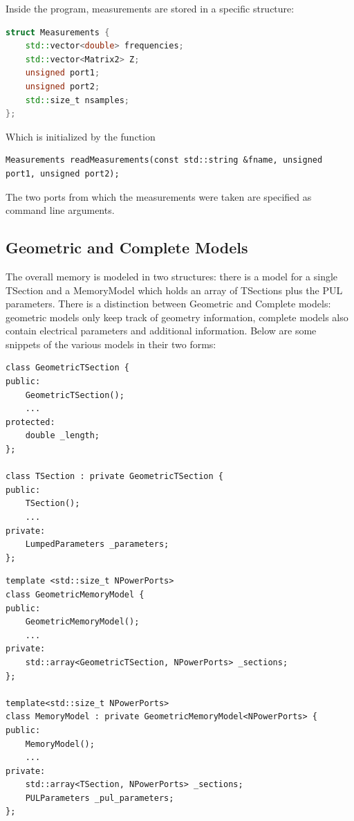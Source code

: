 Inside the program, measurements are stored in a specific structure:
\begin{lstlisting}[language=C++]
struct Measurements {
    std::vector<double> frequencies;
    std::vector<Matrix2> Z;
    unsigned port1;
    unsigned port2;
    std::size_t nsamples;
};
\end{lstlisting}
Which is initialized by the function
\begin{lstlisting}
Measurements readMeasurements(const std::string &fname, unsigned port1, unsigned port2);
\end{lstlisting}
The two ports from which the measurements were taken are specified as command line arguments.

\subsection{Geometric and Complete Models}
The overall memory is modeled in two structures: there is a model for a single TSection and a MemoryModel which holds an array of TSections plus the PUL parameters. There is a distinction between Geometric and Complete models: geometric models only keep track of geometry information, complete models also contain electrical parameters and additional information. Below are some snippets of the various models in their two forms:

\begin{lstlisting}[title=Snippets for Geometric and Complete TSection]
class GeometricTSection {
public:
    GeometricTSection();
    ...
protected:
    double _length;
};

class TSection : private GeometricTSection {
public:
    TSection();
    ...
private:
    LumpedParameters _parameters;
};
\end{lstlisting}

\begin{lstlisting}[title=Snippets for Geometric and Complete MemoryModel]
template <std::size_t NPowerPorts>
class GeometricMemoryModel {
public:
    GeometricMemoryModel();
    ...
private:
    std::array<GeometricTSection, NPowerPorts> _sections;
};

template<std::size_t NPowerPorts>
class MemoryModel : private GeometricMemoryModel<NPowerPorts> {
public:
    MemoryModel();
    ...
private:
    std::array<TSection, NPowerPorts> _sections;
    PULParameters _pul_parameters;
};
\end{lstlisting}

